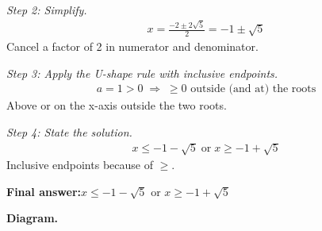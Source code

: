 \documentclass[11pt]{article}
\begin{document}
\textit{Step 2: Simplify.}
\[\begin{gathered}
x = \frac{-2 \pm 2\sqrt{5}}{2} = -1 \pm \sqrt{5}
\end{gathered}\]
Cancel a factor of 2 in numerator and denominator.

\textit{Step 3: Apply the U-shape rule with inclusive endpoints.}
\[\begin{gathered}
a = 1 > 0 \;\Longrightarrow\; \geq 0 \text{ outside (and at) the roots}
\end{gathered}\]
Above or on the x-axis outside the two roots.

\textit{Step 4: State the solution.}
\[\begin{gathered}
x \leq -1 - \sqrt{5} \;\text{or}\; x \geq -1 + \sqrt{5}
\end{gathered}\]
Inclusive endpoints because of \( \geq \).

\begin{answerbox}
\textbf{Final answer:}\quad \(\displaystyle x \leq -1 - \sqrt{5}\) or \(\displaystyle x \geq -1 + \sqrt{5}\)
\end{answerbox}
\textbf{Diagram.}
\end{document}
